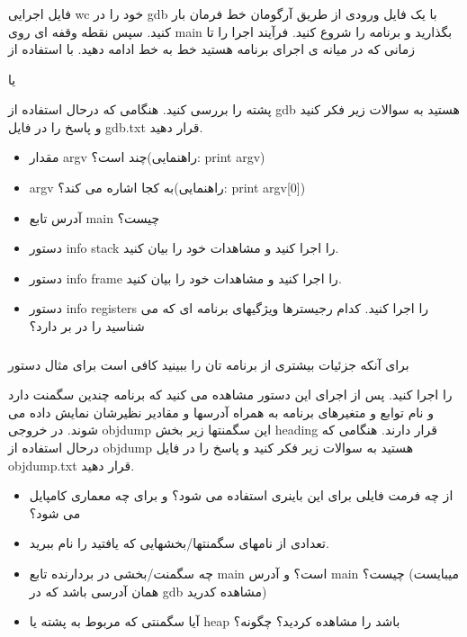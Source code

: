 \subsubsection{
}
فایل اجرایی wc خود را در gdb با یک فایل ورودی از طریق آرگومان خط فرمان بار کنید. سپس نقطه وقفه ای روی main بگذارید و برنامه را شروع کنید. فرآیند اجرا را تا زمانی که در میانه ی اجرای برنامه هستید خط به خط ادامه دهید. با استفاده از \begin{flushleft}
\end{flushleft} یا \begin{flushleft}
\end{flushleft} پشته را بررسی کنید.
هنگامی که درحال استفاده از gdb هستید به سوالات زیر فکر کنید و پاسخ را در فایل gdb.txt قرار دهید.
\begin{itemize}
\item
مقدار argv چند است؟(راهنمایی: print argv)
\item
argv به کجا اشاره می کند؟(راهنمایی: print argv[0])
\item
آدرس تابع main چیست؟
\item
دستور info stack را اجرا کنید و مشاهدات خود را بیان کنید.
\item
دستور info frame را اجرا کنید و مشاهدات خود را بیان کنید.
\item
دستور info registers را اجرا کنید. کدام رجیسترها ویژگیهای برنامه ای که می شناسید را در بر دارد؟
\end{itemize}

\subsubsection{
}
برای آنکه جزئیات بیشتری از برنامه تان را ببینید کافی است برای مثال دستور \begin{flushleft}
\end{flushleft} را اجرا کنید. پس از اجرای این دستور مشاهده می کنید که برنامه چندین سگمنت دارد و نام توابع و متغیرهای برنامه به همراه آدرسها و مقادیر نظیرشان نمایش داده می شوند. در خروجی objdump این سگمنتها زیر بخش heading قرار دارند.
هنگامی که درحال استفاده از objdump هستید به سوالات زیر فکر کنید و پاسخ را در فایل objdump.txt قرار دهید.
\begin{itemize}
\item
از چه فرمت فایلی برای این باینری استفاده می شود؟ و برای چه معماری کامپایل می شود؟
\item
تعدادی از نامهای سگمنتها/بخشهایی که یافتید را نام ببرید.
\item
چه سگمنت/بخشی در بردارنده تابع main است؟ و آدرس main چیست؟ (میبایست همان آدرسی باشد که در gdb مشاهده کدرید)
\item
آیا سگمنتی که مربوط به پشته یا heap باشد را مشاهده کردید؟ چگونه؟
\end{itemize}

